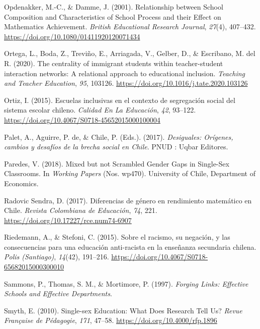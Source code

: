 \documentclass[
]{article}
\begin{document}
\leavevmode\hypertarget{ref-opdenakker_relationship_2001}{}%
Opdenakker, M.-C., \& Damme, J. (2001). Relationship between School
Composition and Characteristics of School Process and their Effect on
Mathematics Achievement. \emph{British Educational Research Journal},
\emph{27}(4), 407--432. \url{https://doi.org/10.1080/01411920120071434}

\leavevmode\hypertarget{ref-ortega_centrality_2020}{}%
Ortega, L., Boda, Z., Treviño, E., Arriagada, V., Gelber, D., \&
Escribano, M. del R. (2020). The centrality of immigrant students within
teacher-student interaction networks: A relational approach to
educational inclusion. \emph{Teaching and Teacher Education}, \emph{95},
103126. \url{https://doi.org/10.1016/j.tate.2020.103126}

\leavevmode\hypertarget{ref-ortiz_escuelas_2015}{}%
Ortiz, I. (2015). Escuelas inclusivas en el contexto de segregación
social del sistema escolar chileno. \emph{Calidad En La Educación},
\emph{42}, 93--122.
\url{https://doi.org/10.4067/S0718-45652015000100004}

\leavevmode\hypertarget{ref-palet_desiguales_2017}{}%
Palet, A., Aguirre, P. de, \& Chile, P. (Eds.). (2017).
\emph{Desiguales: Orígenes, cambios y desafíos de la brecha social en
Chile}. PNUD : Uqbar Editores.

\leavevmode\hypertarget{ref-paredes_mixed_2018}{}%
Paredes, V. (2018). Mixed but not Scrambled Gender Gaps in Single-Sex
Classrooms. In \emph{Working Papers} (Nos. wp470). University of Chile,
Department of Economics.

\leavevmode\hypertarget{ref-radovicsendra_diferencias_2017}{}%
Radovic Sendra, D. (2017). Diferencias de género en rendimiento
matemático en Chile. \emph{Revista Colombiana de Educación}, \emph{74},
221. \url{https://doi.org/10.17227/rce.num74-6907}

\leavevmode\hypertarget{ref-riedemann_sobre_2015}{}%
Riedemann, A., \& Stefoni, C. (2015). Sobre el racismo, su negación, y
las consecuencias para una educación anti-racista en la enseñanza
secundaria chilena. \emph{Polis (Santiago)}, \emph{14}(42), 191--216.
\url{https://doi.org/10.4067/S0718-65682015000300010}

\leavevmode\hypertarget{ref-sammons_forging_1997}{}%
Sammons, P., Thomas, S. M., \& Mortimore, P. (1997). \emph{Forging
Links: Effective Schools and Effective Departments}.

\leavevmode\hypertarget{ref-smyth_singlesex_2010}{}%
Smyth, E. (2010). Single-sex Education: What Does Research Tell Us?
\emph{Revue Française de Pédagogie}, \emph{171}, 47--58.
\url{https://doi.org/10.4000/rfp.1896}
\end{document}
